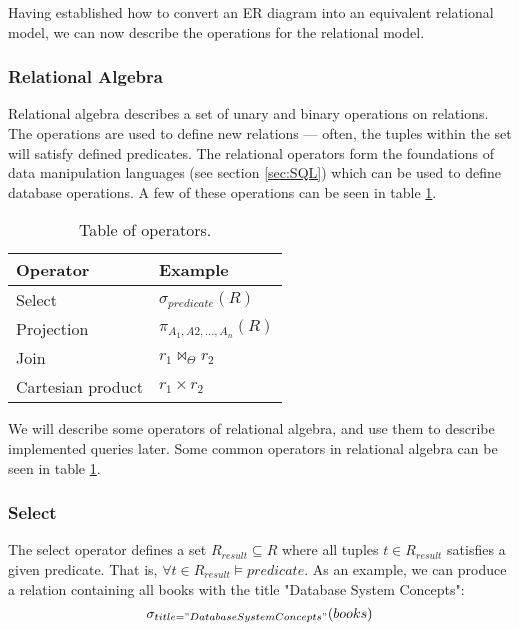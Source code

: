 
Having established how to convert an ER diagram into an equivalent relational model, we can now describe the operations for the relational model.

\subsubsection{Relational Algebra}\label{sec:relationalAlgebra}
Relational algebra describes a set of unary and binary operations on relations.
The operations are used to define new relations --- often, the tuples within the set will satisfy defined predicates.
The relational operators form the foundations of data manipulation languages (see section \ref{sec:SQL}) which can be used to define database operations\cite{DBSBook}.
A few of these operations can be seen in table \ref{Relational algebra operators}.


\begin{table}[h]
    \centering
    \begin{tabular}{|ll|}
    \hline 
    \multicolumn{1}{|l|}{\textbf{Operator}}          & \multicolumn{1}{l|}{\textbf{Example}}   \\ \hline
    \multicolumn{1}{|l|}{Select}                     & \multicolumn{1}{l|}{$\sigma_{predicate}(R)$}            \\ \hline
    \multicolumn{1}{|l|}{Projection}                 & \multicolumn{1}{l|}{$\pi_{A_1, A2,...,A_n}(R)$}           \\ \hline
    \multicolumn{1}{|l|}{Join}                 & \multicolumn{1}{l|}{$r_1 \Join_\Theta r_2$}             \\ \hline
    \multicolumn{1}{|l|}{Cartesian product}          & \multicolumn{1}{l|}{$r_1\times r_2$}              \\ \hline
    \end{tabular}
    \caption{Table of operators.}
    \label{Relational algebra operators}
\end{table}

We will describe some operators of relational algebra, and use them to describe implemented queries later.
Some common operators in relational algebra can be seen in table \ref{Relational algebra operators}.
\subsubsection*{Select}
The select operator defines a set $R_{result}\subseteq R$ where all tuples $t \in R_{result}$ satisfies a given predicate\cite{DBSBook}.
That is, $\forall t \in R_{result} \vDash predicate$.
As an example, we can produce a relation containing all books with the title "Database System Concepts":
$$\sigma_{title = "Database System Concepts"}(books)$$
